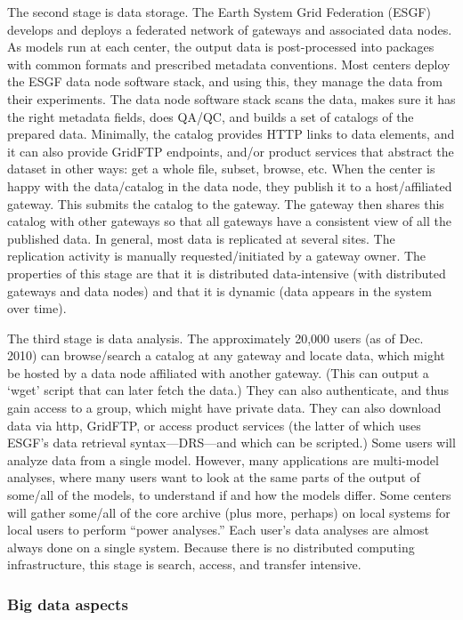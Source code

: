 \documentclass[times]{cpeauth}
\begin{document}
The second stage is data storage.  The Earth System Grid Federation
(ESGF)~\cite{esgf} develops and deploys a federated network of gateways and
associated data nodes.  As models run at each center, the output data is
post-processed into packages with common formats and prescribed metadata
conventions.  Most centers deploy the ESGF data node software stack, and using
this, they manage the data from their experiments.  The data node software stack
scans the data, makes sure it has the right metadata fields, does QA/QC, and
builds a set of catalogs of the prepared data.  Minimally, the catalog provides
HTTP links to data elements, and it can also provide GridFTP endpoints, and/or
product services that abstract the dataset in other ways: get a whole file,
subset, browse, etc.  When the center is happy with the data/catalog in the data
node, they publish it to a host/affiliated gateway.  This submits the catalog to
the gateway.  The gateway then shares this catalog with other gateways so that
all gateways have a consistent view of all the published data.  In general, most
data is replicated at several sites.  The replication activity is manually
requested/initiated by a gateway owner.  The properties of this stage are that
it is distributed data-intensive (with distributed gateways and data nodes) and
that it is dynamic (data appears in the system over time).

The third stage is data analysis.  The approximately 20,000 users (as of
Dec. 2010) can browse/search a catalog at any gateway and locate data, which
might be hosted by a data node affiliated with another gateway. (This can output
a `wget' script that can later fetch the data.)  They can also authenticate, and
thus gain access to a group, which might have private data.  They can also
download data via http, GridFTP, or access product services (the latter of which
uses ESGF's data retrieval syntax---DRS---and which can be scripted.)  Some
users will analyze data from a single model.  However, many applications are
multi-model analyses, where many users want to look at the same parts of the
output of some/all of the models, to understand if and how the models differ.
Some centers will gather some/all of the core archive (plus more, perhaps) on
local systems for local users to perform ``power analyses.''  Each user's data
analyses are almost always done on a single system.  Because there is no
distributed computing infrastructure, this stage is search, access, and transfer
intensive.


 \subsubsection*{Big data aspects} %
\end{document}
